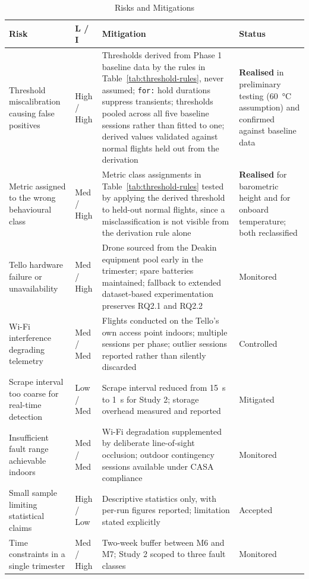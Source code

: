 \begin{table}[htbp]
\centering
\caption{Risks and Mitigations}
\label{tab:risks}
\footnotesize
\begin{tabular}{|p{3.2cm}|p{1.3cm}|p{6.4cm}|p{2.6cm}|}
\hline
\textbf{Risk} & \textbf{L / I} & \textbf{Mitigation} & \textbf{Status} \\
\hline
Threshold miscalibration causing false positives & High / High & Thresholds derived from Phase 1 baseline data by the rules in Table~\ref{tab:threshold-rules}, never assumed; \texttt{for:} hold durations suppress transients; thresholds pooled across all five baseline sessions rather than fitted to one; derived values validated against normal flights held out from the derivation & \textbf{Realised} in preliminary testing (\SI{60}{\celsius} assumption) and confirmed against baseline data \\
\hline
Metric assigned to the wrong behavioural class & Med / High & Metric class assignments in Table~\ref{tab:threshold-rules} tested by applying the derived threshold to held-out normal flights, since a misclassification is not visible from the derivation rule alone & \textbf{Realised} for barometric height and for onboard temperature; both reclassified \\
\hline
Tello hardware failure or unavailability & Med / High & Drone sourced from the Deakin equipment pool early in the trimester; spare batteries maintained; fallback to extended dataset-based experimentation preserves RQ2.1 and RQ2.2 & Monitored \\
\hline
Wi-Fi interference degrading telemetry & Med / Med & Flights conducted on the Tello's own access point indoors; multiple sessions per phase; outlier sessions reported rather than silently discarded & Controlled \\
\hline
Scrape interval too coarse for real-time detection & Low / Med & Scrape interval reduced from \SI{15}{\second} to \SI{1}{\second} for Study 2; storage overhead measured and reported & Mitigated \\
\hline
Insufficient fault range achievable indoors & Med / Med & Wi-Fi degradation supplemented by deliberate line-of-sight occlusion; outdoor contingency sessions available under CASA compliance & Monitored \\
\hline
Small sample limiting statistical claims & High / Low & Descriptive statistics only, with per-run figures reported; limitation stated explicitly & Accepted \\
\hline
Time constraints in a single trimester & Med / High & Two-week buffer between M6 and M7; Study 2 scoped to three fault classes & Monitored \\
\hline
\end{tabular}
\end{table}


